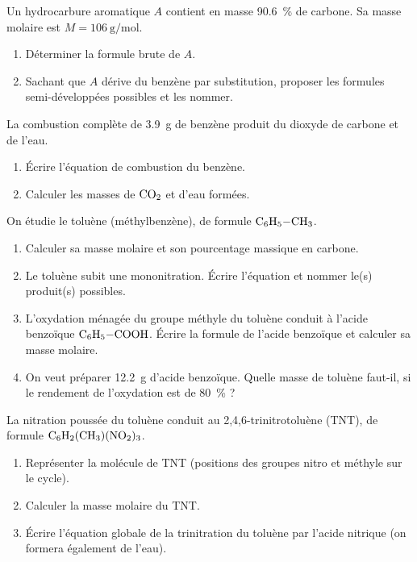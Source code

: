 
\exo{} Un hydrocarbure aromatique $A$ contient en masse \SI{90.6}{\percent}
de carbone. Sa masse molaire est $M = \SI{106}{\gram\per\mol}$.
\begin{enumerate}[label=\arabic*)]
\item Déterminer la formule brute de $A$.
\item Sachant que $A$ dérive du benzène par substitution, proposer les formules
semi-développées possibles et les nommer.
\end{enumerate}

\exo{} La combustion complète de \SI{3.9}{\gram} de benzène produit du
dioxyde de carbone et de l'eau.
\begin{enumerate}[label=\arabic*)]
\item Écrire l'équation de combustion du benzène.
\item Calculer les masses de $\ce{CO2}$ et d'eau formées.
\end{enumerate}


On étudie le toluène (méthylbenzène), de formule $\ce{C6H5-CH3}$.
\begin{enumerate}[label=\arabic*)]
\item Calculer sa masse molaire et son pourcentage massique en carbone.
\item Le toluène subit une mononitration. Écrire l'équation et nommer le(s) produit(s)
possibles.
\item L'oxydation ménagée du groupe méthyle du toluène conduit à l'acide benzoïque
$\ce{C6H5-COOH}$. Écrire la formule de l'acide benzoïque et calculer sa masse molaire.
\item On veut préparer \SI{12.2}{\gram} d'acide benzoïque. Quelle masse de toluène
faut-il, si le rendement de l'oxydation est de \SI{80}{\percent} ?
\end{enumerate}

\sujetbac[Le trinitrotoluène]
La nitration poussée du toluène conduit au 2,4,6-trinitrotoluène (TNT), de formule
$\ce{C6H2(CH3)(NO2)3}$.
\begin{enumerate}[label=\arabic*)]
\item Représenter la molécule de TNT (positions des groupes nitro et méthyle sur le cycle).
\item Calculer la masse molaire du TNT.
\item Écrire l'équation globale de la trinitration du toluène par l'acide nitrique
(on formera également de l'eau).
\end{enumerate}
